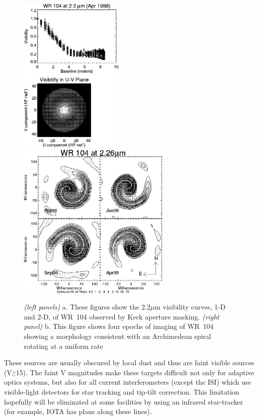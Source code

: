 \documentclass[12pt]{article}
\newcommand{\simge}{\mbox{$\stackrel{>}{_{\sim}}$}}
\begin{document}
\begin{figure}
\begin{center}
 \includegraphics[clip,angle=0,height=3.0in]{Figures/JDM_showcase_wr104.eps}
  \includegraphics[clip,angle=0,height=3.0in]{Figures/JDM_wr104_4ep.eps}
\caption{
  \footnotesize {\em (left panels)} a. These figures show the
  2.2$\mu$m visibility curves, 1-D and 2-D, of WR~104 observed by Keck
  aperture masking.  {\em (right panel)} b. This figure shows four
  epochs of imaging of WR~104 showing a morphology consistent with an
  Archimedean spiral rotating at a uniform rate \citep[from][Figure
  13.6]{monnier99}
\label{wr104fig}}
\end{center}
\end{figure}

These sources are usually  obscured by local dust and thus are
faint visible sources (V$\simge$15). The faint V magnitudes make these
targets difficult not only for adaptive optics systems, but also for
all current interferometers (except the ISI) which use visible-light
detectors for star tracking and tip-tilt correction.  This limitation
hopefully will be eliminated at some facilities by using an infrared
star-tracker (for example, IOTA has plans along these lines).
\end{document}
